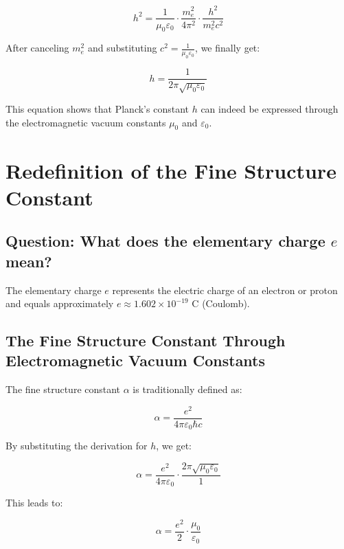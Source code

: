 \documentclass{article}
\begin{document}
	\begin{equation}
		h^2 = \frac{1}{\mu_0\varepsilon_0} \cdot \frac{m_e^2}{4\pi^2} \cdot \frac{h^2}{m_e^2c^2}
	\end{equation}
	
	After canceling $m_e^2$ and substituting $c^2 = \frac{1}{\mu_0\varepsilon_0}$, we finally get:

\begin{equation}
	h = \frac{1}{2\pi\sqrt{\mu_0\varepsilon_0}}
\end{equation}

This equation shows that Planck's constant $h$ can indeed be expressed through the electromagnetic vacuum constants $\mu_0$ and $\varepsilon_0$.

\section{Redefinition of the Fine Structure Constant}

\subsection{Question: What does the elementary charge $e$ mean?}

The elementary charge $e$ represents the electric charge of an electron or proton and equals approximately $e \approx 1.602 \times 10^{-19}$ C (Coulomb).

\subsection{The Fine Structure Constant Through Electromagnetic Vacuum Constants}

The fine structure constant $\alpha$ is traditionally defined as:

\begin{equation}
	\alpha = \frac{e^2}{4\pi\varepsilon_0\hbar c}
\end{equation}

By substituting the derivation for $h$, we get:

\begin{equation}
	\alpha = \frac{e^2}{4\pi\varepsilon_0} \cdot \frac{2\pi\sqrt{\mu_0\varepsilon_0}}{1}
\end{equation}

This leads to:

\begin{equation}
	\alpha = \frac{e^2}{2} \cdot \frac{\mu_0}{\varepsilon_0}
\end{equation}
\end{document}
